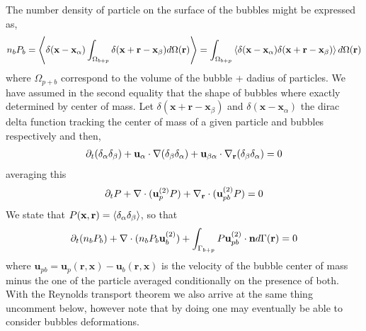 \documentclass[12pt]{My_preprint}
\begin{document}
The number density of particle on the surface of the bubbles might be expressed as, 
\begin{equation}
    n_b P_b 
    = 
    \left<\delta(\textbf{x}-\textbf{x}_\alpha) \int_{\Omega_{b+p}} \delta(\textbf{x} + \textbf{r} - \textbf{x}_\beta) d\Omega(\textbf{r})\right>
    = 
    \int_{\Omega_{b+p}}\left<\delta(\textbf{x}-\textbf{x}_\alpha)  \delta(\textbf{x} + \textbf{r} - \textbf{x}_\beta) \right>d\Omega(\textbf{r})
\end{equation}
where $\Omega_{p+b}$ correspond to the volume of the bubble + dadius of particles. 
We have assumed in the second equality that the shape of bubbles where exactly determined by center of mass. 
Let $\delta(\textbf{x} +\textbf{r}- \textbf{x}_\beta)$ and $\delta(\textbf{x} - \textbf{x}_\alpha)$ the dirac delta function tracking the center of mass of a given particle and bubbles respectively and then, 
\begin{align}
    \partial_t (\delta_\alpha\delta_\beta)
    + \textbf{u}_\alpha \cdot \mathbf{\nabla} (\delta_\beta \delta_\alpha) 
    + \textbf{u}_{\beta\alpha} \cdot {\mathbf{\nabla}_\textbf{r}} (\delta_\beta \delta_\alpha) = 0
\end{align}
averaging this 
\begin{align}
    \partial_t P
    +  \mathbf{\nabla}\cdot (\textbf{u}_p^{(2)} P) 
    +  {\mathbf{\nabla}_\textbf{r}}\cdot (\textbf{u}_{pb}^{(2)} P) = 0
\end{align}
We state that $P(\textbf{x},\textbf{r}) = \left<\delta_\alpha \delta_\beta\right>$, so that 
\begin{equation}
    \partial_t (n_bP_b)
    +  \mathbf{\nabla}\cdot (n_b P_b \textbf{u}_b^{(2)} )
    + \int_{\Gamma_{b+p}} P \textbf{u}_{pb}^{(2)}\cdot \textbf{n} d\Gamma(\textbf{r})
    = 0 
\end{equation}
where $\textbf{u}_{pb} = \textbf{u}_p(\textbf{r},\textbf{x}) - \textbf{u}_b(\textbf{r},\textbf{x})$ is the velocity of the bubble center of mass minus the one of the particle averaged conditionally on the presence of both. 
With the Reynolds transport theorem we also arrive at the same thing uncomment below, however note that by doing one may eventually be able to consider bubbles deformations. 
\end{document}
